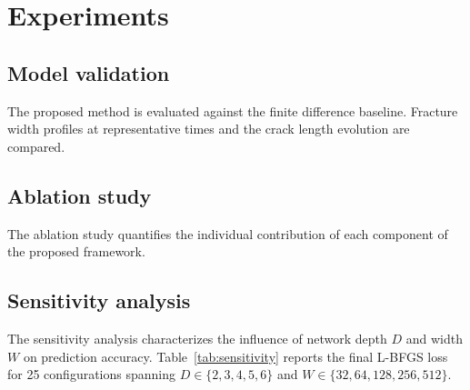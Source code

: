 \documentclass[a4paper,fleqn]{cas-sc}
\begin{document}
\section{Experiments}\label{sec:experiments}

\subsection{Model validation}\label{sec:validation}


The proposed method is evaluated against the finite difference
baseline. Fracture width profiles at representative times and the
crack length evolution are compared.

\subsection{Ablation study}\label{sec:ablation}


The ablation study quantifies the individual contribution of each
component of the proposed framework.

\subsection{Sensitivity analysis}\label{sec:sensitivity}

The sensitivity analysis characterizes the influence of network depth
$D$ and width $W$ on prediction accuracy. Table~\ref{tab:sensitivity}
reports the final L-BFGS loss for 25 configurations spanning
$D \in \{2,3,4,5,6\}$ and $W \in \{32, 64, 128, 256, 512\}$.
\end{document}
